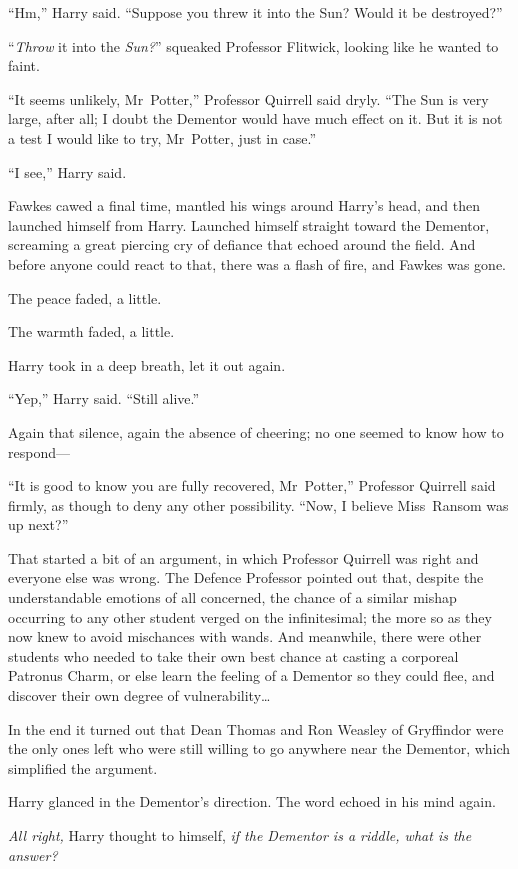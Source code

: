 “Hm,” Harry said. “Suppose you threw it into the Sun? Would it be destroyed?”

“\emph{Throw} it into the \emph{Sun?}” squeaked Professor Flitwick, looking like he wanted to faint.

“It seems unlikely, Mr~Potter,” Professor Quirrell said dryly. “The Sun is very large, after all; I doubt the Dementor would have much effect on it. But it is not a test I would like to try, Mr~Potter, just in case.”

“I see,” Harry said.

Fawkes cawed a final time, mantled his wings around Harry’s head, and then launched himself from Harry. Launched himself straight toward the Dementor, screaming a great piercing cry of defiance that echoed around the field. And before anyone could react to that, there was a flash of fire, and Fawkes was gone.

The peace faded, a little.

The warmth faded, a little.

Harry took in a deep breath, let it out again.

“Yep,” Harry said. “Still alive.”

Again that silence, again the absence of cheering; no one seemed to know how to respond—

“It is good to know you are fully recovered, Mr~Potter,” Professor Quirrell said firmly, as though to deny any other possibility. “Now, I believe Miss~Ransom was up next?”

That started a bit of an argument, in which Professor Quirrell was right and everyone else was wrong. The Defence Professor pointed out that, despite the understandable emotions of all concerned, the chance of a similar mishap occurring to any other student verged on the infinitesimal; the more so as they now knew to avoid mischances with wands. And meanwhile, there were other students who needed to take their own best chance at casting a corporeal Patronus Charm, or else learn the feeling of a Dementor so they could flee, and discover their own degree of vulnerability…

In the end it turned out that Dean Thomas and Ron Weasley of Gryffindor were the only ones left who were still willing to go anywhere near the Dementor, which simplified the argument.

Harry glanced in the Dementor’s direction. The word echoed in his mind again.

\emph{All right,} Harry thought to himself, \emph{if the Dementor is a riddle, what is the answer?}

